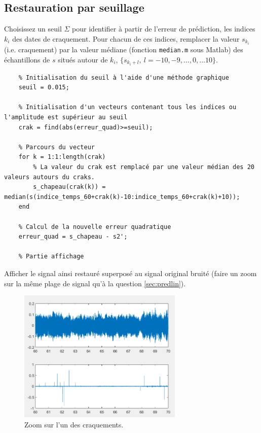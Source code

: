 \documentclass{article}
\begin{document}
\subsection{Restauration par seuillage}

Choisissez un seuil $\Sigma$ pour identifier à partir de l'erreur de prédiction, les indices $k_i$ des dates de craquement.  Pour chacun de ces indices,  remplacer la valeur $s_{k_i}$ (i.e. craquement) par la valeur médiane (fonction {\tt median.m} sous Matlab) des échantillons de $s$ situés autour de $k_i$, $\{s_{k_i+l},~l=-10, -9,\ldots, 0 , \ldots 10\}$.

\begin{verbatim}
    % Initialisation du seuil à l'aide d'une méthode graphique
    seuil = 0.015;
    
    % Initialisation d'un vecteurs contenant tous les indices ou l'amplitude est supérieur au seuil
    crak = find(abs(erreur_quad)>=seuil);
    
    % Parcours du vecteur 
    for k = 1:1:length(crak)
        % La valeur du crak est remplacé par une valeur médian des 20 valeurs autours du craks.
        s_chapeau(crak(k)) = median(s(indice_temps_60+crak(k)-10:indice_temps_60+crak(k)+10));
    end
    
    % Calcul de la nouvelle erreur quadratique 
    erreur_quad = s_chapeau - s2';
    
    % Partie affichage 
\end{verbatim}

Afficher le signal ainsi restauré  superposé au signal original bruité (faire un zoom sur la même plage de signal qu'à la question \ref{sec:predlin}).\\

\begin{figure}[!h]
    \centering
    \includegraphics[width=0.7\textwidth]{images/signalcraquement.png}
    \caption{Zoom sur l'un des craquements.}
    \label{fig-binaire}
\end{figure}
\end{document}
